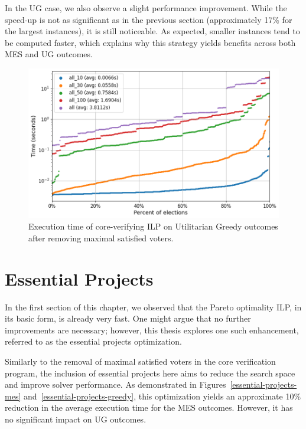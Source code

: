 \documentclass[magisterska,en]{pracamgr}
\newcommand\chartsize{0.94}
\begin{document}
In the UG case, we also observe a slight performance improvement. While the speed-up is not as significant as in the previous section (approximately 17\% for the largest instances), it is still noticeable. As expected, smaller instances tend to be computed faster, which explains why this strategy yields benefits across both MES and UG outcomes.

\begin{figure}[h!]
    \centering
    \includegraphics[width=\chartsize\linewidth]{outputs/VotersRemoval/greedy.png}
    \caption{Execution time of core-verifying ILP on Utilitarian Greedy outcomes after removing maximal satisfied voters.}
    \label{voters-removal-greedy}
\end{figure}

\section{Essential Projects}

In the first section of this chapter, we observed that the Pareto optimality ILP, in its basic form, is already very fast. One might argue that no further improvements are necessary; however, this thesis explores one such enhancement, referred to as the essential projects optimization.

Similarly to the removal of maximal satisfied voters in the core verification program, the inclusion of essential projects here aims to reduce the search space and improve solver performance. As demonstrated in Figures~\ref{essential-projects-mes} and~\ref{essential-projects-greedy}, this optimization yields an approximate 10\% reduction in the average execution time for the MES outcomes. However, it has no significant impact on UG outcomes.
\end{document}
